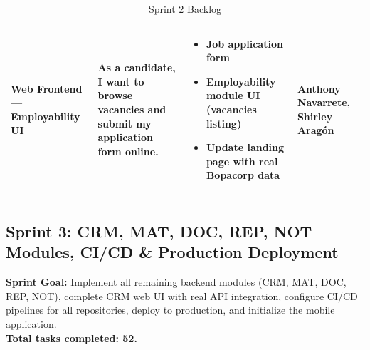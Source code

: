 \documentclass[letterpaper%
, oneside%
, 12pt%
, memoireprojet%
, english%
,creativecommons,hyperref, withAlgo2e %
]{thETS}
\begin{document}
\begin{longtable}{|p{3.2cm}|p{4.4cm}|p{5.4cm}|p{3.0cm}|}
Web Frontend — Employability UI & As a candidate, I want to browse vacancies and submit my application form online. & \begin{itemize}\setlength{\itemsep}{2pt}
    \item Job application form
    \item Employability module UI (vacancies listing)
    \item Update landing page with real Bopacorp data
\end{itemize} & Anthony Navarrete, Shirley Aragón \\ \hline
\caption{Sprint 2 Backlog}
\label{tab:sprint2_backlog}
\end{longtable}
\endgroup

\subsection{Sprint 3: CRM, MAT, DOC, REP, NOT Modules, CI/CD \& Production Deployment}
\textbf{Sprint Goal:} Implement all remaining backend modules (CRM, MAT, DOC, REP, NOT), complete CRM web UI with real API integration, configure CI/CD pipelines for all repositories, deploy to production, and initialize the mobile application. \\
\textbf{Total tasks completed: 52.}
\end{document}
